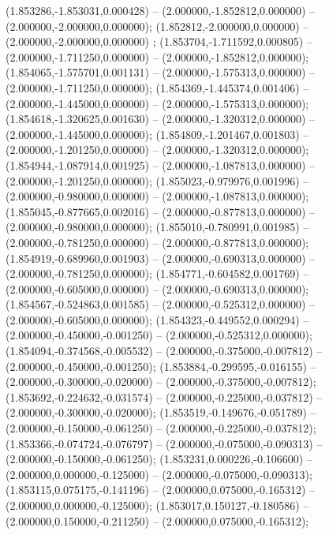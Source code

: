  (1.853286,-1.853031,0.000428) -- (2.000000,-1.852812,0.000000) -- (2.000000,-2.000000,0.000000);
 (1.852812,-2.000000,0.000000) -- (2.000000,-2.000000,0.000000) ;
 (1.853704,-1.711592,0.000805) -- (2.000000,-1.711250,0.000000) -- (2.000000,-1.852812,0.000000);
 (1.854065,-1.575701,0.001131) -- (2.000000,-1.575313,0.000000) -- (2.000000,-1.711250,0.000000);
 (1.854369,-1.445374,0.001406) -- (2.000000,-1.445000,0.000000) -- (2.000000,-1.575313,0.000000);
 (1.854618,-1.320625,0.001630) -- (2.000000,-1.320312,0.000000) -- (2.000000,-1.445000,0.000000);
 (1.854809,-1.201467,0.001803) -- (2.000000,-1.201250,0.000000) -- (2.000000,-1.320312,0.000000);
 (1.854944,-1.087914,0.001925) -- (2.000000,-1.087813,0.000000) -- (2.000000,-1.201250,0.000000);
 (1.855023,-0.979976,0.001996) -- (2.000000,-0.980000,0.000000) -- (2.000000,-1.087813,0.000000);
 (1.855045,-0.877665,0.002016) -- (2.000000,-0.877813,0.000000) -- (2.000000,-0.980000,0.000000);
 (1.855010,-0.780991,0.001985) -- (2.000000,-0.781250,0.000000) -- (2.000000,-0.877813,0.000000);
 (1.854919,-0.689960,0.001903) -- (2.000000,-0.690313,0.000000) -- (2.000000,-0.781250,0.000000);
 (1.854771,-0.604582,0.001769) -- (2.000000,-0.605000,0.000000) -- (2.000000,-0.690313,0.000000);
 (1.854567,-0.524863,0.001585) -- (2.000000,-0.525312,0.000000) -- (2.000000,-0.605000,0.000000);
 (1.854323,-0.449552,0.000294) -- (2.000000,-0.450000,-0.001250) -- (2.000000,-0.525312,0.000000);
 (1.854094,-0.374568,-0.005532) -- (2.000000,-0.375000,-0.007812) -- (2.000000,-0.450000,-0.001250);
 (1.853884,-0.299595,-0.016155) -- (2.000000,-0.300000,-0.020000) -- (2.000000,-0.375000,-0.007812);
 (1.853692,-0.224632,-0.031574) -- (2.000000,-0.225000,-0.037812) -- (2.000000,-0.300000,-0.020000);
 (1.853519,-0.149676,-0.051789) -- (2.000000,-0.150000,-0.061250) -- (2.000000,-0.225000,-0.037812);
 (1.853366,-0.074724,-0.076797) -- (2.000000,-0.075000,-0.090313) -- (2.000000,-0.150000,-0.061250);
 (1.853231,0.000226,-0.106600) -- (2.000000,0.000000,-0.125000) -- (2.000000,-0.075000,-0.090313);
 (1.853115,0.075175,-0.141196) -- (2.000000,0.075000,-0.165312) -- (2.000000,0.000000,-0.125000);
 (1.853017,0.150127,-0.180586) -- (2.000000,0.150000,-0.211250) -- (2.000000,0.075000,-0.165312);
